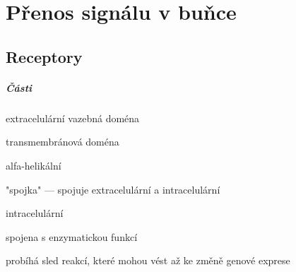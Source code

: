 \documentclass[DIV=8]{scrreprt}
\begin{document}
\chapter{Přenos signálu v buňce} \label{Přenos signálu v buňce}


\section{Receptory} \label{Receptory} \FloatBarrier


\paragraph{Části}
\begin{myItemize}[nosep]
    \item extracelulární vazebná doména
    \item transmembránová doména
\begin{myItemize}[nosep]
    \item alfa-helikální
    \item "spojka" --- spojuje extracelulární a intracelulární
\end{myItemize}

    \item intracelulární
\begin{myItemize}[nosep]
    \item spojena s enzymatickou funkcí
    \item probíhá sled reakcí, které mohou vést až ke změně genové exprese
\end{myItemize}

\end{myItemize}
\end{document}
